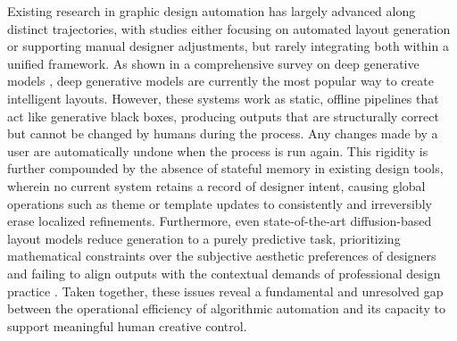 \begin{refsection}
Existing research in graphic design automation has largely advanced along distinct trajectories, with studies either focusing on automated layout generation or supporting manual designer adjustments, but rarely integrating both within a unified framework. As shown in a comprehensive survey on deep generative models \cite{Shi2023Survey}, deep generative models are currently the most popular way to create intelligent layouts. However, these systems work as static, offline pipelines that act like generative black boxes, producing outputs that are structurally correct but cannot be changed by humans during the process. Any changes made by a user are automatically undone when the process is run again. This rigidity is further compounded by the absence of stateful memory in existing design tools, wherein no current system retains a record of designer intent, causing global operations such as theme or template updates to consistently and irreversibly erase localized refinements. Furthermore, even state-of-the-art diffusion-based layout models reduce generation to a purely predictive task, prioritizing mathematical constraints over the subjective aesthetic preferences of designers and failing to align outputs with the contextual demands of professional design practice \cite{Zhang2023LayoutDiffusion, Patnaik2025AesthetiQ}. Taken together, these issues reveal a fundamental and unresolved gap between the operational efficiency of algorithmic automation and its capacity to support meaningful human creative control.


\end{refsection}
